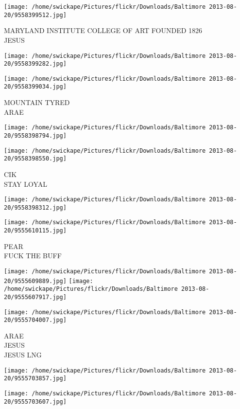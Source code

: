 \documentclass[10pt,letterpaper]{article}
\begin{document}
\vspace{0.25in}
\texttt{[image: /home/swickape/Pictures/flickr/Downloads/Baltimore 2013-08-20/9558399512.jpg]}

MARYLAND INSTITUTE COLLEGE OF ART FOUNDED 1826\\
JESUS
\pagebreak

\texttt{[image: /home/swickape/Pictures/flickr/Downloads/Baltimore 2013-08-20/9558399282.jpg]}

\vspace{0.25in}
\texttt{[image: /home/swickape/Pictures/flickr/Downloads/Baltimore 2013-08-20/9558399034.jpg]}

MOUNTAIN TYRED\\
ARAE
\pagebreak

\texttt{[image: /home/swickape/Pictures/flickr/Downloads/Baltimore 2013-08-20/9558398794.jpg]}

\vspace{0.25in}
\texttt{[image: /home/swickape/Pictures/flickr/Downloads/Baltimore 2013-08-20/9558398550.jpg]}

CIK\\
STAY LOYAL
\pagebreak

\texttt{[image: /home/swickape/Pictures/flickr/Downloads/Baltimore 2013-08-20/9558398312.jpg]}

\vspace{0.25in}
\texttt{[image: /home/swickape/Pictures/flickr/Downloads/Baltimore 2013-08-20/9555610115.jpg]}

PEAR\\
FUCK THE BUFF
\pagebreak

\texttt{[image: /home/swickape/Pictures/flickr/Downloads/Baltimore 2013-08-20/9555609889.jpg]}
\texttt{[image: /home/swickape/Pictures/flickr/Downloads/Baltimore 2013-08-20/9555607917.jpg]}

\texttt{[image: /home/swickape/Pictures/flickr/Downloads/Baltimore 2013-08-20/9555704007.jpg]}

ARAE\\
JESUS\\
JESUS LNG
\pagebreak

\texttt{[image: /home/swickape/Pictures/flickr/Downloads/Baltimore 2013-08-20/9555703857.jpg]}

\vspace{0.25in}
\texttt{[image: /home/swickape/Pictures/flickr/Downloads/Baltimore 2013-08-20/9555703607.jpg]}
\end{document}
